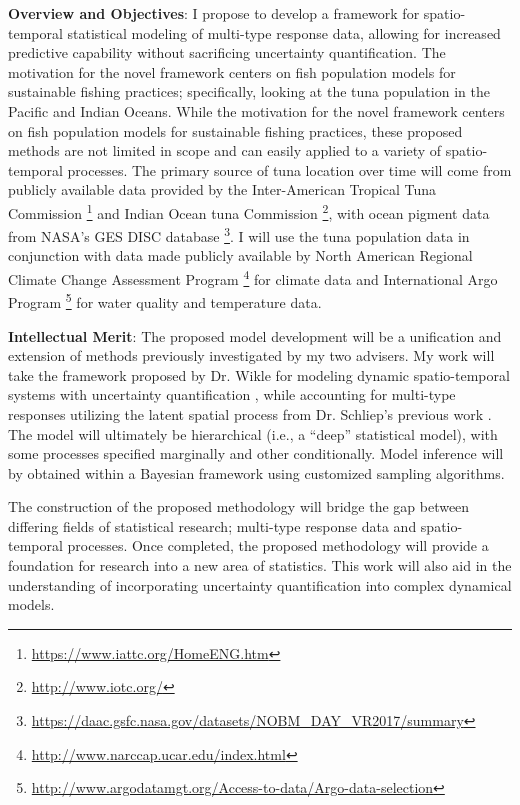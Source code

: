 \documentclass[12pt]{article}
\begin{document}
\vspace{2mm}

\noindent \textbf{Overview and Objectives}: I propose to develop a framework for spatio-temporal statistical modeling of multi-type response data, allowing for increased predictive capability without sacrificing uncertainty quantification. The motivation for the novel framework centers on fish population models for sustainable fishing practices; specifically, looking at the tuna population in the Pacific and Indian Oceans. While the motivation for the novel framework centers on fish population models for sustainable fishing practices, these proposed methods are not limited in scope and can easily applied to a variety of spatio-temporal processes. The primary source of tuna location over time will come from publicly available data provided by the Inter-American Tropical Tuna Commission \footnote{\url{https://www.iattc.org/HomeENG.htm}} and Indian Ocean tuna Commission \footnote{\url{http://www.iotc.org/}}, with ocean pigment data from NASA's GES DISC database \footnote{\url{https://daac.gsfc.nasa.gov/datasets/NOBM_DAY_VR2017/summary}}. I will use the tuna population data in conjunction with data made publicly available by North American Regional Climate Change Assessment Program \footnote{\url{http://www.narccap.ucar.edu/index.html}} for climate data and International Argo Program \footnote{\url{http://www.argodatamgt.org/Access-to-data/Argo-data-selection}} for water quality and temperature data.


\vspace{2mm}

\noindent \textbf{Intellectual Merit}: 
The proposed model development will be a unification and extension of methods previously investigated by my two advisers. My work will take the framework proposed by Dr. Wikle for modeling dynamic spatio-temporal systems with uncertainty quantification \citep{wikle_2017, cressie_wikle_2011}, while accounting for multi-type responses utilizing the latent spatial process from Dr. Schliep's previous work \citep{schliep}. The model will ultimately be hierarchical (i.e., a ``deep'' statistical model), with some processes specified marginally and other conditionally. Model inference will by obtained within a Bayesian framework using customized sampling algorithms.

The construction of the proposed methodology will bridge the gap between differing fields of statistical research; multi-type response data and spatio-temporal processes. Once completed, the proposed methodology will provide a foundation for research into a new area of statistics. This work will also aid in the understanding of incorporating uncertainty quantification into complex dynamical models.
\end{document}
